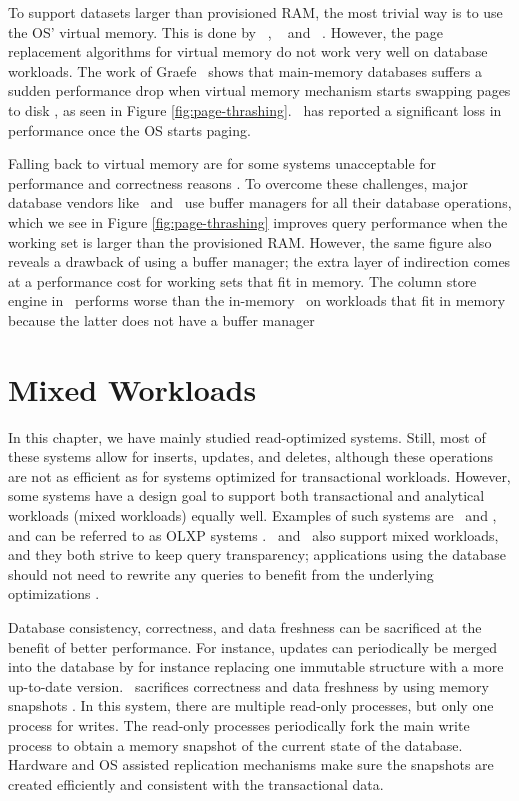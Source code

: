 To support datasets larger than provisioned RAM, the most trivial way is to use the OS' virtual memory. This is done by \monetdb~\cite{Boncz2002-yj}, \blink~\cite{Barber2014-ey} and \qlikview~\cite{Qlik2011-ef}. However, the page replacement algorithms for virtual memory do not work very well on database workloads. The work of Graefe \ea~shows that main-memory databases suffers a sudden performance drop when virtual memory mechanism starts swapping pages to disk \cite{Graefe2014-ds} , as seen in Figure \ref{fig:page-thrashing}. \qlikview~has reported a significant loss in performance once the OS starts paging. 

Falling back to virtual memory are for some systems unacceptable for performance and correctness reasons \cite{Graefe2014-ds}. To overcome these challenges, major database vendors like \oracle~and \mssql~use buffer managers for all their database operations, which we see in Figure \ref{fig:page-thrashing} improves query performance when the working set is larger than the provisioned RAM. However, the same figure also reveals a drawback of using a buffer manager; the extra layer of indirection comes at a performance cost for working sets that fit in memory. The column store engine in \mssql~performs worse than the in-memory \vertipaq~on workloads that fit in memory because the latter does not have a buffer manager \cite{Ferrari2012-hm}

\section{Mixed Workloads}
\label{sec:Mixed Workloads}
In this chapter, we have mainly studied read-optimized systems. Still, most of these systems allow for inserts, updates, and deletes,  although these operations are not as efficient as for systems optimized for transactional workloads. However, some systems have a design goal to support both transactional and analytical workloads (mixed workloads) equally well. Examples of such systems are \hyrise~and \hyper, and can be referred to as OLXP systems \cite{Plattner2014-fr}. \oracle~and \saph~also support mixed workloads, and they both strive to keep query transparency; applications using the database should not need to rewrite any queries to benefit from the underlying optimizations \cite{Farber2012-vh, Lahiri2015-mz}.

Database consistency, correctness, and data freshness can be sacrificed at the benefit of better performance. For instance, updates can periodically be merged into the database by for instance replacing one immutable structure with a more up-to-date version. \hyper~sacrifices correctness and data freshness by using memory snapshots \cite{Kemper2011-ap}. In this system, there are multiple read-only processes, but only one process for writes. The read-only processes periodically fork the main write process to obtain a memory snapshot of the current state of the database. Hardware and OS assisted replication mechanisms make sure the snapshots are created efficiently and consistent with the transactional data.

